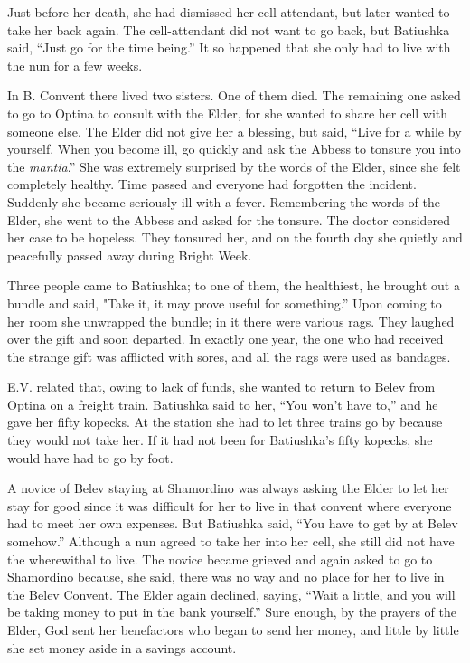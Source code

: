 Just before her death, she had dismissed her cell attendant, but later wanted to take her back again. The cell-attendant did not want to go back, but Batiushka said, “Just go for the time being.” It so happened that she only had to live with the nun for a few weeks.

In B. Convent there lived two sisters. One of them died. The remaining one asked to go to Optina to consult with the Elder, for she wanted to share her cell with someone else. The Elder did not give her a blessing, but said, “Live for a while by yourself. When you become ill, go quickly and ask the Abbess to tonsure you into the \textit{mantia}.” She was extremely surprised by the words of the Elder, since she felt completely healthy. Time passed and everyone had forgotten the incident. Suddenly she became seriously ill with a fever. Remembering the words of the Elder, she went to the Abbess and asked for the tonsure. The doctor considered her case to be hopeless. They tonsured her, and on the fourth day she quietly and peacefully passed away during Bright Week.

Three people came to Batiushka; to one of them, the healthiest, he brought out a bundle and said, "Take it, it may prove useful for something.” Upon coming to her room she unwrapped the bundle; in it there were various rags. They laughed over the gift and soon departed. In exactly one year, the one who had received the strange gift was afflicted with sores, and all the rags were used as bandages.

E.V. related that, owing to lack of funds, she wanted to return to Belev from Optina on a freight train. Batiushka said to her, “You won't have to,” and he gave her fifty kopecks. At the station she had to let three trains go by because they would not take her. If it had not been for Batiushka's fifty kopecks, she would have had to go by foot.

A novice of Belev staying at Shamordino was always asking the Elder to let her stay for good since it was difficult for her to live in that convent where everyone had to meet her own expenses. But Batiushka said, “You have to get by at Belev somehow.” Although a nun agreed to take her into her cell, she still did not have the wherewithal to live. The novice became grieved and again asked to go to Shamordino because, she said, there was no way and no place for her to live in the Belev Convent. The Elder again declined, saying, “Wait a little, and you will be taking money to put in the bank yourself.” Sure enough, by the prayers of the Elder, God sent her benefactors who began to send her money, and little by little she set money aside in a savings account.

